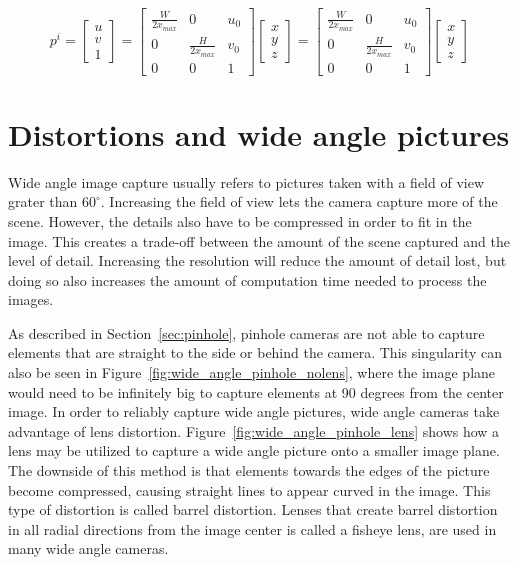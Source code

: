 \begin{equation}
    p^i = \begin{bmatrix}
        u \\ v \\ 1
    \end{bmatrix} = \begin{bmatrix}
        \frac{W}{2x_{max}} & 0 & u_0 \\
        0 & \frac{H}{2x_{max}} & v_0 \\
        0 & 0 & 1
    \end{bmatrix}\begin{bmatrix}
        x \\ y \\ z
    \end{bmatrix} = \begin{bmatrix}
        \frac{W}{2x_{max}} & 0 & u_0 \\
        0 & \frac{H}{2x_{max}} & v_0 \\
        0 & 0 & 1
    \end{bmatrix}\begin{bmatrix}
        x \\ y \\ z
    \end{bmatrix}
    \label{eq:pixel_transform}
\end{equation}

\section{Distortions and wide angle pictures}

Wide angle image capture usually refers to pictures taken with a field of view grater than $60^\circ$. Increasing the field of view lets the camera capture more of the scene. However, the details also have to be compressed in order to fit in the image. This creates a trade-off between the amount of the scene captured and the level of detail. Increasing the resolution will reduce the amount of detail lost, but doing so also increases the amount of computation time needed to process the images.

As described in Section~\ref{sec:pinhole}, pinhole cameras are not able to capture elements that are straight to the side or behind the camera. This singularity can also be seen in Figure~\ref{fig:wide_angle_pinhole_nolens}, where the image plane would need to be infinitely big to capture elements at 90 degrees from the center image. In order to reliably capture wide angle pictures, wide angle cameras take advantage of lens distortion. Figure~\ref{fig:wide_angle_pinhole_lens} shows how a lens may be utilized to capture a wide angle picture onto a smaller image plane. The downside of this method is that elements towards the edges of the picture become compressed, causing straight lines to appear curved in the image. This type of distortion is called barrel distortion. Lenses that create barrel distortion in all radial directions from the image center is called a fisheye lens, are used in many wide angle cameras.

